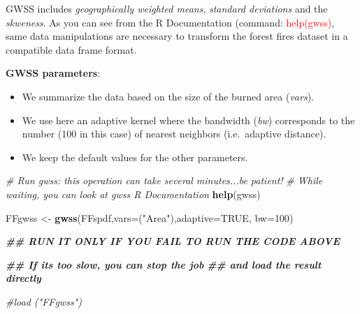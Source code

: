 \documentclass[
]{book}
\newenvironment{Shaded}{\begin{snugshade}}{\end{snugshade}}
\newcommand{\AttributeTok}[1]{\textcolor[rgb]{0.13,0.29,0.53}{#1}}
\newcommand{\CommentTok}[1]{\textcolor[rgb]{0.56,0.35,0.01}{\textit{#1}}}
\newcommand{\ConstantTok}[1]{\textcolor[rgb]{0.56,0.35,0.01}{#1}}
\newcommand{\DecValTok}[1]{\textcolor[rgb]{0.00,0.00,0.81}{#1}}
\newcommand{\DocumentationTok}[1]{\textcolor[rgb]{0.56,0.35,0.01}{\textbf{\textit{#1}}}}
\newcommand{\FunctionTok}[1]{\textcolor[rgb]{0.13,0.29,0.53}{\textbf{#1}}}
\newcommand{\NormalTok}[1]{#1}
\newcommand{\OtherTok}[1]{\textcolor[rgb]{0.56,0.35,0.01}{#1}}
\newcommand{\SpecialCharTok}[1]{\textcolor[rgb]{0.81,0.36,0.00}{\textbf{#1}}}
\newcommand{\StringTok}[1]{\textcolor[rgb]{0.31,0.60,0.02}{#1}}
\begin{document}
GWSS includes \emph{geographically weighted means}, \emph{standard deviations} and the \emph{skweness}.
As you can see from the R Documentation (command: \textcolor{red}{help(gwss)}, same data manipulations are necessary to transform the forest fires dataset in a compatible data frame format.

\textbf{GWSS parameters}:

\begin{itemize}
\item
  We summarize the data based on the size of the burned area (\emph{vars}).
\item
  We use here an adaptive kernel where the bandwidth (\emph{bw}) corresponds to the number (100 in this case) of nearest neighbors (i.e.~adaptive distance).
\item
  We keep the default values for the other parameters.
\end{itemize}

\begin{Shaded}
\end{Shaded}

\begin{Shaded}
\begin{Highlighting}[]
\CommentTok{\# Run gwss: this operation can take several minutes...be patient!}
\CommentTok{\# While waiting, you can look at gwss R Documentation}
\FunctionTok{help}\NormalTok{(gwss)}

\NormalTok{FFgwss }\OtherTok{\textless{}{-}} \FunctionTok{gwss}\NormalTok{(FFspdf,}\AttributeTok{vars=}\NormalTok{(}\StringTok{"Area"}\NormalTok{),}\AttributeTok{adaptive=}\ConstantTok{TRUE}\NormalTok{, }\AttributeTok{bw=}\DecValTok{100}\NormalTok{)}
\end{Highlighting}
\end{Shaded}

\begin{Shaded}
\begin{Highlighting}[]
\DocumentationTok{\#\# RUN IT ONLY IF YOU FAIL TO RUN THE CODE ABOVE}

\DocumentationTok{\#\#  If it\textquotesingle{}s too slow, you can stop the job }
\DocumentationTok{\#\# and load the result directly}

\CommentTok{\#load ("FFgwss")}
\end{Highlighting}
\end{Shaded}
\end{document}
